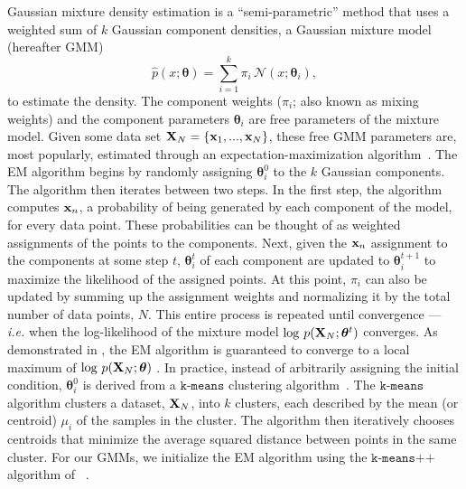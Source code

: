 \documentclass[12pt, letterpaper, preprint]{aastex6}
\newcommand{\beq}{\begin{equation}}
\newcommand{\eeq}{\end{equation}}
\newcommand{\gmm}{{\small{GMM}}\xspace}
\newcommand{\gmms}{{\small{GMM}s}\xspace}
\newcommand{\EM}{{\small{EM}}\xspace}
\begin{document}
Gaussian mixture density estimation is a ``semi-parametric'' method 
that uses a weighted sum of $k$ Gaussian component densities, a Gaussian 
mixture model (hereafter \gmm)
\beq
\widehat{p}(x; \bm{\theta}) = \sum\limits_{i=1}^{k} \pi_i\, \mathcal{N}(x; \bm{\theta}_i),
\eeq
to estimate the density. 
The component weights ($\pi_i$; also known as mixing weights) and the 
component parameters $\bm{\theta}_i$ are free parameters of the mixture 
model. Given some data set ${\bf X}_N = \{{\bf x}_1,..., {\bf x}_N \}$, 
these free \gmm parameters are, most popularly, estimated 
through an expectation-maximization algorithm~\citep[\EM;][]{dempster1977, neal1998}.
The \EM algorithm begins by randomly assigning $\bm{\theta}^0_i$ to the 
$k$ Gaussian components. The algorithm then iterates between two steps. 
In the first step, the algorithm computes ${\bf x}_n$, 
a probability of being generated by each component of the model, for every data point. These 
probabilities can be thought of as weighted assignments of the points 
to the components. Next, given the ${\bf x}_n$ assignment to the 
components at some step $t$, $\bm{\theta}^t_i$ of each component are updated to $\bm{\theta}^{t+1}_i$
to maximize the likelihood of the assigned points. At this point, $\pi_i$ 
can also be updated by summing up the assignment weights and 
normalizing it by the total number of data points, $N$. This entire
process is repeated until convergence --- \emph{i.e.} when the log-likelihood of the
mixture model $\log\,p({\bf X}_N; \bm{\theta}^t)$ %
converges. 
{\color{red} As demonstrated in \cite{wu1983}, the \EM algorithm is guaranteed 
to converge to a local maximum of $\log\,p({\bf X}_N; \bm{\theta})$ .} 
In practice, instead of arbitrarily assigning the initial condition, $\bm{\theta}^0_i$ 
is derived from a $\texttt{k-means}$ clustering algorithm~\citep{lloyd1982}. The 
$\texttt{k-means}$ algorithm clusters a dataset, ${\bf X}_N$, into $k$ 
clusters, each described by the mean (or centroid) $\mu_i$ of the
samples in the cluster. The algorithm then iteratively chooses centroids that 
minimize the average squared distance between points in the same cluster.
For our \gmms, we initialize the \EM algorithm using 
the $\texttt{k-means++}$ algorithm of ~\cite{arthur2007}. 

\end{document}
